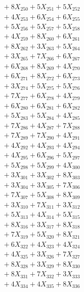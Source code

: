 \documentclass[a4paper,10pt]{article}
\begin{document}
{\begin{align}
&\;  + 8 X_{250} + 5 X_{251} + 5 X_{252} \\[0.3ex]
&\;  + 4 X_{253} + 6 X_{254} + 6 X_{255} \\[0.3ex]
&\;  + 5 X_{256} + 5 X_{257} + 5 X_{258} \\[0.3ex]
&\;  + 4 X_{259} + 8 X_{260} + 6 X_{261} \\[0.3ex]
&\;  + 8 X_{262} + 3 X_{263} + 5 X_{264} \\[0.3ex]
&\;  + 3 X_{265} + 7 X_{266} + 6 X_{267} \\[0.3ex]
&\;  + 6 X_{268} + 8 X_{269} + 4 X_{270} \\[0.3ex]
&\;  + 6 X_{271} + 8 X_{272} + 6 X_{273} \\[0.3ex]
&\;  + 3 X_{274} + 5 X_{275} + 5 X_{276} \\[0.3ex]
&\;  + 7 X_{277} + 6 X_{278} + 4 X_{279} \\[0.5ex]\allowbreak
&\;  + 6 X_{280} + 6 X_{281} + 6 X_{282} \\[0.3ex]
&\;  + 5 X_{283} + 5 X_{284} + 4 X_{285} \\[0.3ex]
&\;  + 7 X_{286} + 4 X_{287} + 7 X_{288} \\[0.3ex]
&\;  + 7 X_{289} + 7 X_{290} + 4 X_{291} \\[0.3ex]
&\;  + 4 X_{292} + 4 X_{293} + 4 X_{294} \\[0.3ex]
&\;  + 4 X_{295} + 6 X_{296} + 5 X_{297} \\[0.3ex]
&\;  + 5 X_{298} + 5 X_{299} + 4 X_{300} \\[0.3ex]
&\;  + 3 X_{301} + 3 X_{302} + 8 X_{303} \\[0.3ex]
&\;  + 3 X_{304} + 3 X_{305} + 7 X_{306} \\[0.3ex]
&\;  + 7 X_{307} + 5 X_{308} + 8 X_{309} \\[0.5ex]\allowbreak
&\;  + 3 X_{310} + 7 X_{311} + 3 X_{312} \\[0.3ex]
&\;  + 5 X_{313} + 4 X_{314} + 5 X_{315} \\[0.3ex]
&\;  + 8 X_{316} + 3 X_{317} + 8 X_{318} \\[0.3ex]
&\;  + 7 X_{319} + 5 X_{320} + 8 X_{321} \\[0.3ex]
&\;  + 6 X_{322} + 4 X_{323} + 4 X_{324} \\[0.3ex]
&\;  + 4 X_{325} + 3 X_{326} + 7 X_{327} \\[0.3ex]
&\;  + 8 X_{328} + 3 X_{329} + 8 X_{330} \\[0.3ex]
&\;  + 8 X_{331} + 7 X_{332} + 3 X_{333} \\[0.3ex]
&\;  + 4 X_{334} + 4 X_{335} + 8 X_{336} \\[0.3ex]

\end{align}}
\end{document}
